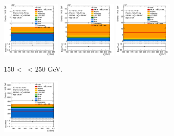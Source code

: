 \begin{figure}[h!]
    \centering
    \begin{subfigure}[b]{\textwidth}
        \centering
        \includegraphics[width=0.32\textwidth]{Images/VH/Own_fit/prefit_VHbb/Region_distpTV_BMax250_BMin150_DCRHigh_J2_TTypebb_T2_L0_Y6051_Prefit.png}
        \includegraphics[width=0.32\textwidth]{Images/VH/Own_fit/prefit_VHbb/Region_distpTV_BMax250_BMin150_DCRHigh_J3_TTypebb_T2_L0_Y6051_Prefit.png}
        \includegraphics[width=0.32\textwidth]{Images/VH/Own_fit/prefit_VHbb/Region_distpTV_BMax250_BMin150_DCRHigh_J4_TTypebb_T2_L0_Y6051_Prefit.png}
        \caption{150 < \ptv\ < 250 GeV.}
        \label{fig:plots_VHbb_OL_150_CRH}
    \end{subfigure}
    \begin{subfigure}[b]{\textwidth}
        \centering
        \includegraphics[width=0.32\textwidth]{Images/VH/Own_fit/prefit_VHbb/Region_distpTV_BMax400_BMin250_DCRHigh_J2_TTypebb_T2_L0_Y6051_Prefit.png}

\end{subfigure}
\end{figure}
